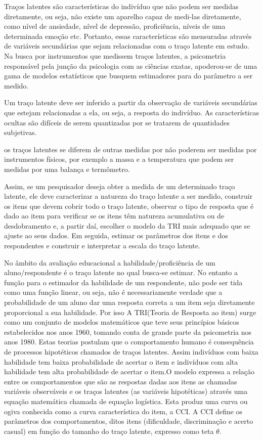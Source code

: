 	 \par
		Traços latentes são características do indivíduo que não podem ser medidas diretamente, ou seja, não existe um aparelho capaz de medi-las diretamente, como nível de ansiedade, nível de depressão, proficiência, níveis de uma determinada emoção etc. Portanto, essas características são mensuradas através de variáveis secundárias que sejam relacionadas com o traço latente em estudo. Na busca por instrumentos que medissem traços latentes, a psicometria responsável pela junção da psicologia com as ciências exatas, apoderou-se de uma gama de modelos estatísticos que busquem estimadores para do parâmetro a ser medido.
	\par
	    Um traço latente deve ser inferido a partir da observação de variáveis secundárias que estejam relacionadas a ela, ou seja, a resposta do indivíduo. As características ocultas são difíceis de serem quantizadas por se tratarem de quantidades subjetivas.\\ 
	\par
	    os traços latentes se diferem de outras medidas por não poderem ser medidas por instrumentos físicos, por exemplo a massa e a temperatura que podem ser medidas por uma balança e termômetro.
	\par
	    Assim, se um pesquisador deseja obter a medida de um determinado traço latente, ele deve caracterizar a natureza do traço latente a ser medido, construir os itens que devem cobrir todo o traço latente, observar o tipo de resposta que é dado ao item para verificar se os itens têm natureza acumulativa ou de desdobramento e, a partir daí, escolher o modelo da TRI mais adequado que se ajuste ao seus dados. Em seguida, estimar os parâmetros dos itens e dos respondentes e construir e interpretar a escala do traço latente.
	\par
	    No âmbito da avaliação educacional a habilidade/proficiência de um aluno/respondente é o  traço latente no qual busca-se estimar. No entanto a função para o estimador da  habilidade de um respondente, não pode ser tida como uma função linear, ou seja, não é necessariamente verdade que a probabilidade de um aluno dar uma resposta correta a um item seja diretamente proporcional a sua habilidade. Por isso  A TRI(Teoria de Resposta ao item) surge como um conjunto de modelos matemáticos  que teve seus princípios básicos estabelecidos nos anos 1960, tomando conta de grande parte da psicometria nos anos 1980. Estas teorias postulam que o comportamento humano é consequência de processos hipotéticos chamados de traços latentes. Assim indivíduos com baixa habilidade tem baixa probabilidade de acertar o item e indivíduos com alta habilidade tem alta probabilidade de acertar o item.O modelo expressa a relação entre os comportamentos que são as respostas dadas aos itens as chamadas variáveis observáveis e os traços latentes (as variáveis hipotéticas) através uma equação matemática chamada de equação logística. Esta produz uma curva ou ogiva conhecida como a curva característica do item, a CCI. A CCI define os parâmetros dos comportamentos, ditos itens (dificuldade, discriminação e acerto casual) em função do tamanho do traço latente, expresso como teta $\theta$.\cite{Pasquali}
